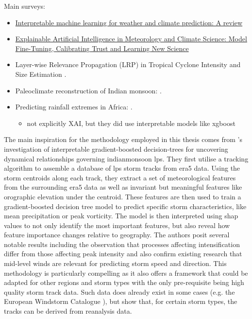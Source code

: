 Main surveys:
\begin{itemize}
    \item \href{https://www.sciencedirect.com/science/article/pii/S1352231024004722}{Interpretable machine learning for weather and climate prediction: A review}
    \item \href{https://link.springer.com/chapter/10.1007/978-3-031-04083-2_16#Sec2}{Explainable Artificial Intelligence in Meteorology and Climate Science: Model Fine-Tuning, Calibrating Trust and Learning New Science}
\end{itemize}
\begin{itemize}
    \item Layer-wise Relevance Propagation (LRP) in Tropical Cyclone Intensity and Size Estimation .
    \item Paleoclimate reconstruction of Indian monsoon: .
    \item Predicting rainfall extremes in Africa: .
    \begin{itemize}
        \item not explicitly XAI, but they did use interpretable models like xgboost
    \end{itemize}
\end{itemize}

The main inspiration for the methodology employed in this thesis comes from \cite{Hunt2024}'s investigation of interpretable gradient-boosted decision-trees for uncovering dynamical relationships governing \gls{indianmonsoon} \acrfull{lps}. They first utilise a tracking algorithm to assemble a database of \acrshort{lps} storm tracks from \acrshort{era5} data. Using the storm centroids along each track, they extract a set of meteorological features from the surrounding \acrshort{era5} data as well as invariant but meaningful features like orographic elevation under the centroid. These features are then used to train a gradient-boosted decision tree model to predict specific storm characteristics, like mean precipitation or peak vorticity. The model is then interpreted using \acrshort{shap} values to not only identify the most important features, but also reveal how feature importance changes relative to geography. The authors posit several notable results including the observation that processes affecting intensification differ from those affecting peak intensity and also confirm existing research that mid-level winds are relevant for predicting storm speed and direction. This methodology is particularly compelling as it also offers a framework that could be adapted for other regions and storm types with the only pre-requisite being high quality storm track data. Such data does already exist in some cases (e.g. the European Windstorm Catalogue \citep{Roberts2014}), but \cite{Hunt2024} show that, for certain storm types, the tracks can be derived from reanalysis data.

